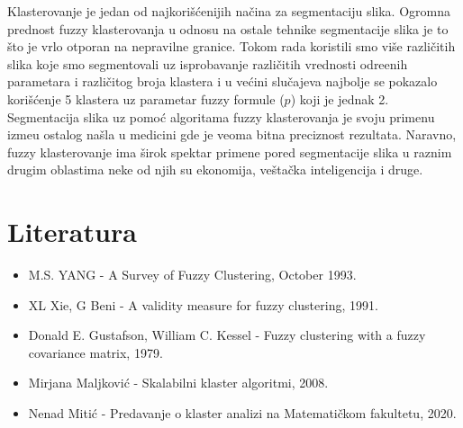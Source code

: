 \documentclass{article}
\begin{document}
Klasterovanje je jedan od najkori\v{s}\'{c}enijih na\v{c}ina za segmentaciju slika. Ogromna prednost {\selectfont fuzzy} klasterovanja u odnosu na ostale tehnike segmentacije slika je to \v{s}to je vrlo otporan na nepravilne granice. Tokom rada koristili smo vi\v{s}e razli\v{c}itih slika koje smo segmentovali uz isprobavanje razli\v{c}itih vrednosti odre\dj enih parametara i razli\v{c}itog broja klastera i u ve\'{c}ini slu\v{c}ajeva najbolje se pokazalo kori\v{s}\'{c}enje 5 klastera uz parametar {\selectfont fuzzy} formule ($p$) koji je jednak 2. Segmentacija slika uz pomo\'{c} algoritama {\selectfont fuzzy} klasterovanja je svoju primenu izme\dj u ostalog na\v{s}la u medicini gde je veoma bitna preciznost rezultata. Naravno, {\selectfont fuzzy} klasterovanje ima \v{s}irok spektar primene pored segmentacije slika u raznim drugim oblastima neke od njih su ekonomija, ve\v{s}ta\v{c}ka inteligencija i druge.

\newpage
\section{\selectfont Literatura}

\selectfont
\begin{itemize}
\item M.S. YANG - A Survey of Fuzzy Clustering, October 1993.
\item XL Xie, G Beni - A validity measure for fuzzy clustering, 1991.
\item Donald E. Gustafson, William C. Kessel - Fuzzy clustering with a fuzzy covariance matrix, 1979.
\selectfont
\item Mirjana Maljkovi\'{c} - Skalabilni klaster algoritmi, 2008.
\item Nenad Miti\'{c} - Predavanje o klaster analizi na Matemati\v{c}kom fakultetu, 2020.
\end{itemize}
\end{document}
